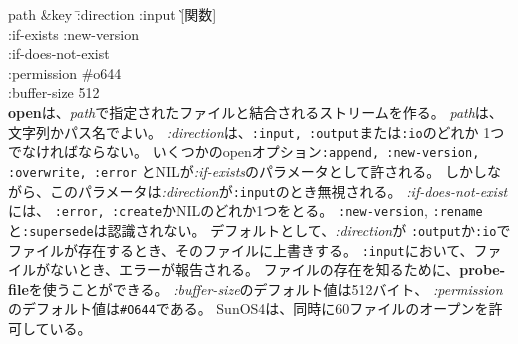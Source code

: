 \begin{refdesc}





{path \&key \= :direction :input \` [関数]\\
 \> :if-exists :new-version \\
 \> :if-does-not-exist \\
 \> :permission \#o644 \\
 \> :buffer-size 512\\}{
{\bf open}は、{\em path}で指定されたファイルと結合されるストリームを作る。
{\em path}は、文字列かパス名でよい。
{\em :direction}は、{\tt :input, :output}または{\tt :io}のどれか
1つでなければならない。
いくつかのopenオプション{\tt :append, :new-version, :overwrite, :error}
とNILが{\em :if-exists}のパラメータとして許される。
しかしながら、このパラメータは{\em :direction}が{\tt :input}のとき無視される。
{\em :if-does-not-exist}には、
{\tt :error, :create}かNILのどれか1つをとる。
{\tt :new-version}, {\tt :rename}と{\tt :supersede}は認識されない。
デフォルトとして、{\em :direction}が
{\tt :output}か{\tt :io}でファイルが存在するとき、そのファイルに上書きする。
{\tt :input}において、ファイルがないとき、エラーが報告される。
ファイルの存在を知るために、{\bf probe-file}を使うことができる。
{\em :buffer-size}のデフォルト値は512バイト、
{\em :permission}のデフォルト値は{\tt \#O644}である。
SunOS4は、同時に60ファイルのオープンを許可している。
}



\end{refdesc}
